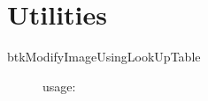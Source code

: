 \section{Utilities}


\begin{description}
 \item[btkModifyImageUsingLookUpTable] usage:
\end{description}